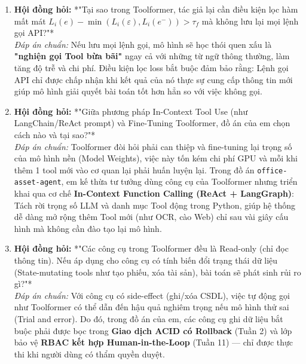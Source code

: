 \documentclass[11pt,a4paper]{article}
\begin{document}
\begin{deepdivebox}
\begin{enumerate}[leftmargin=1.5em]
    \item \textbf{Hội đồng hỏi:} *"Tại sao trong Toolformer, tác giả lại cần điều kiện lọc hàm mất mát $L_i(e) - \min(L_i(\varepsilon), L_i(e^-)) > \tau_f$ mà không lưu lại mọi lệnh gọi API?"*\\
    \textit{Đáp án chuẩn:} Nếu lưu mọi lệnh gọi, mô hình sẽ học thói quen xấu là \textbf{"nghiện gọi Tool bừa bãi"} ngay cả với những từ ngữ thông thường, làm tăng độ trễ và chi phí. Điều kiện lọc loss bắt buộc đảm bảo rằng: Lệnh gọi API chỉ được chấp nhận khi kết quả của nó thực sự cung cấp thông tin mới giúp mô hình giải quyết bài toán tốt hơn hẳn so với việc không gọi.
    
    \item \textbf{Hội đồng hỏi:} *"Giữa phương pháp In-Context Tool Use (như LangChain/ReAct prompt) và Fine-Tuning Toolformer, đồ án của em chọn cách nào và tại sao?"*\\
    \textit{Đáp án chuẩn:} Toolformer đòi hỏi phải can thiệp và fine-tuning lại trọng số của mô hình nền (Model Weights), việc này tốn kém chi phí GPU và mỗi khi thêm 1 tool mới vào cơ quan lại phải huấn luyện lại. Trong đồ án \texttt{office-asset-agent}, em kế thừa tư tưởng dùng công cụ của Toolformer nhưng triển khai qua cơ chế \textbf{In-Context Function Calling (ReAct + LangGraph)}: Tách rời trọng số LLM và danh mục Tool động trong Python, giúp hệ thống dễ dàng mở rộng thêm Tool mới (như OCR, cào Web) chỉ sau vài giây cấu hình mà không cần đào tạo lại mô hình.

    \item \textbf{Hội đồng hỏi:} *"Các công cụ trong Toolformer đều là Read-only (chỉ đọc thông tin). Nếu áp dụng cho công cụ có tính biến đổi trạng thái dữ liệu (State-mutating tools như tạo phiếu, xóa tài sản), bài toán sẽ phát sinh rủi ro gì?"*\\
    \textit{Đáp án chuẩn:} Với công cụ có side-effect (ghi/xóa CSDL), việc tự động gọi như Toolformer có thể dẫn đến hậu quả nghiêm trọng nếu mô hình thử sai (Trial and error). Do đó, trong đồ án của em, các công cụ ghi dữ liệu bắt buộc phải được bọc trong \textbf{Giao dịch ACID có Rollback} (Tuần 2) và lớp bảo vệ \textbf{RBAC kết hợp Human-in-the-Loop} (Tuần 11) — chỉ được thực thi khi người dùng có thẩm quyền duyệt.
\end{enumerate}
\end{deepdivebox}
\end{document}

